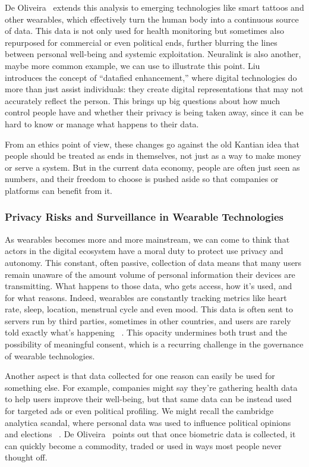 	De Oliveira~\cite{deOliveira2022} extends this analysis to emerging technologies like smart tattoos and other wearables, which effectively turn the human body into a continuous source of data. 
	This data is not only used for health monitoring but sometimes also repurposed for commercial or even political ends, further blurring the lines between personal well-being and systemic exploitation. Neuralink is also another, maybe more common example, we can use to illustrate this point.
	Liu~\cite{Liu2025} introduces the concept of “datafied enhancement,” where digital technologies do more than just assist individuals: they create digital representations that may not accurately reflect the person. This brings up big questions about how much control people have and whether their privacy is being taken away, since it can be hard to know or manage what happens to their data. 

	From an ethics point of view, these changes go against the old  Kantian idea that people should be treated as ends in themselves, not just as a way to make money or serve a system. But in the current data economy, people are often just seen as numbers, and their freedom to choose is pushed aside so that companies or platforms can benefit from it.
	\subsubsection{Privacy Risks and Surveillance in Wearable Technologies}

	As wearables becomes more and more mainstream, we can come to think that actors in the digital ecosystem have a moral duty to protect use privacy and autonomy. This constant, often passive, collection of data means that many users remain unaware of the amount volume of personal information their devices are transmitting. What happens to those data, who gets access, how it’s used, and for what reasons. Indeed, wearables are constantly tracking metrics like heart rate, sleep, location, menstrual cycle and even mood. This data is often sent to servers run by third parties, sometimes in other countries, and users are rarely told exactly what’s happening ~\cite{Sui2023}. This opacity undermines both trust and the possibility of meaningful consent, which is a recurring challenge in the governance of wearable technologies.

	Another aspect is that data collected for one reason can easily be used for something else. For example, companies might say they’re gathering health data to help users improve their well-being, but that same data can be instead used for targeted ads or even political profiling. We might recall the cambridge analytica scandal, where personal data was used to influence political opinions and elections ~\cite{Kanakia2019}. De Oliveira~\cite{deOliveira2022} points out that once biometric data is collected, it can quickly become a commodity, traded or used in ways most people never thought off. 

